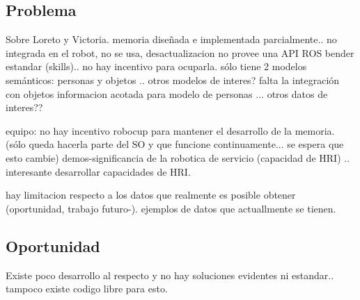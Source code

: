 \documentclass[12pt,letterpaper,spanish]{article}
\begin{document}




\subsection{Problema}

Sobre Loreto  \cite{Sanchez:2015} y Victoria.
memoria dise\~nada e implementada parcialmente.. 
no integrada en el robot, no se usa, desactualizacion
no provee una API ROS bender estandar (skills).. no hay incentivo para ocuparla.
sólo tiene 2 modelos semánticos: personas y objetos .. otros modelos de interes?
falta la integraci\'on con objetos
informacion acotada para modelo de personas ... otros datos de interes??

equipo:
no hay incentivo robocup para mantener el desarrollo de la memoria. (sólo queda hacerla parte del SO y que funcione continuamente... se espera que esto cambie)
demos-significancia de la robotica de servicio (capacidad de HRI) .. interesante desarrollar capacidades de HRI.

hay limitacion respecto a los datos que realmente es posible obtener (oportunidad, trabajo futuro-). ejemplos de datos que actuallmente se tienen.



%




\subsection{Oportunidad}

Existe poco desarrollo al respecto y no hay soluciones evidentes ni estandar.. tampoco existe codigo libre para esto. \\
\end{document}
